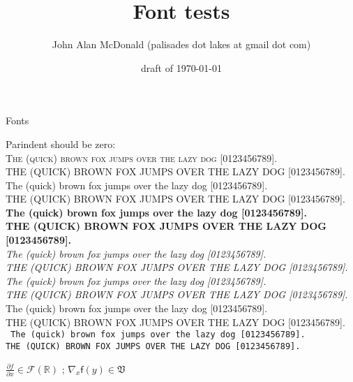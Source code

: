 \documentclass{PalisadesLakesArticle}
\title{Font tests}
\author{John Alan McDonald 
(palisades dot lakes at gmail dot com)}
\date{draft of \today}
\begin{document}
\def\sharedFolder{../shared/}

\begin{plSection}{Fonts}

Parindent should be zero:\\
\textsc{
The (quick) brown fox jumps over the lazy dog [0123456789].\\
THE (QUICK) BROWN FOX JUMPS OVER THE LAZY DOG [0123456789].\\
}
\textrm{
The (quick) brown fox jumps over the lazy dog [0123456789].\\
THE (QUICK) BROWN FOX JUMPS OVER THE LAZY DOG [0123456789].\\
}
\textbf{
The (quick) brown fox jumps over the lazy dog [0123456789].\\
THE (QUICK) BROWN FOX JUMPS OVER THE LAZY DOG [0123456789].\\
}
\textit{
The (quick) brown fox jumps over the lazy dog [0123456789].\\
THE (QUICK) BROWN FOX JUMPS OVER THE LAZY DOG [0123456789].\\
}
\textsl{
The (quick) brown fox jumps over the lazy dog [0123456789].\\
THE (QUICK) BROWN FOX JUMPS OVER THE LAZY DOG [0123456789].\\
}
\textsf{
The (quick) brown fox jumps over the lazy dog [0123456789].\\
THE (QUICK) BROWN FOX JUMPS OVER THE LAZY DOG [0123456789].\\
}
\texttt{
The (quick) brown fox jumps over the lazy dog [0123456789].\\
THE (QUICK) BROWN FOX JUMPS OVER THE LAZY DOG [0123456789].\\
}

$
\frac
{\partial f}{\partial x} 
\in \mathcal{F}\left(\mathbb{R}\right)$
;
$\nabla_{x} \mathsf{f} (y) \in \mathfrak{V}$


\end{plSection}
\end{document}

